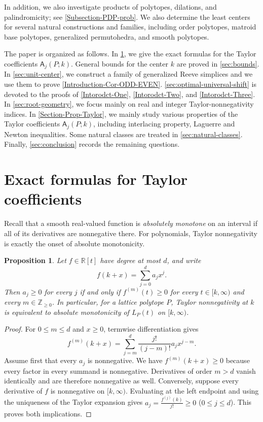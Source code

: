 \documentclass[reqno, 12pt]{article}
\numberwithin{equation}{section}
\newtheorem{proposition}[theorem]{Proposition}
\theoremstyle{definition}
\newcommand{\R}{\mathbb{R}}
\newcommand{\N}{\mathbb{Z}_{\geq 0}}
\newcommand{\A}{\mathsf{A}}
\begin{document}
In addition, we also investigate products of polytopes, dilations, and palindromicity; see \cref{Subsection-PDP-prob}.
We also determine the least centers for several natural constructions and families, including order polytopes, matroid base polytopes, generalized permutohedra, and smooth polytopes.


The paper is organized as follows. 
In \cref{sec:exact}, we give the exact formulas for the Taylor coefficients $\A_{j}(P;k)$.
General bounds for the center $k$ are proved in \cref{sec:bounds}. 
In \cref{sec:unit-center}, we construct a family of generalized Reeve simplices and we use them to prove \cref{Introduction-Cor-ODD-EVEN}.
\cref{sec:optimal-universal-shift} is devoted to the proofs of \cref{Intorodct-One}, \cref{Intorodct-Two}, and \cref{Intorodct-Three}.
In \cref{sec:root-geometry}, we focus mainly on real and integer Taylor-nonnegativity indices.
In \cref{Section-Prop-Taylor}, we mainly study various properties of the Taylor coefficients  $\A_j(P;k)$, including interlacing property, Laguerre and Newton inequalities.
Some natural classes are treated in \cref{sec:natural-classes}.  
Finally, \cref{sec:conclusion} records the remaining questions.



\section{Exact formulas for Taylor coefficients}
\label{sec:exact}

Recall that a smooth real-valued function is \emph{absolutely monotone} on an interval if all of its derivatives are nonnegative there. For polynomials, Taylor nonnegativity is exactly the onset of absolute monotonicity.

\begin{proposition}\label{prop:absolute-monotonicity}
Let $f\in\R[t]$ have degree at most $d$, and write
\[
 f(k+x)=\sum_{j=0}^{d}a_jx^j.
\]
Then $a_j\geq0$ for every $j$ if and only if $f^{(m)}(t)\geq0$ for every $t\in[k,\infty)$ and every $m\in\N$.
In particular, for a lattice polytope $P$, Taylor nonnegativity at $k$ is
equivalent to absolute monotonicity of $L_P(t)$ on $[k,\infty)$.
\end{proposition}
\begin{proof}
For $0\leq m\leq d$ and $x\geq0$, termwise differentiation gives
\[f^{(m)}(k+x)=\sum_{j=m}^{d}\frac{j!}{(j-m)!}a_jx^{j-m}.
\]
Assume first that every $a_j$ is nonnegative. We have $f^{(m)}(k+x)\geq0$ because every factor in every summand is nonnegative.  Derivatives of order $m>d$ vanish identically and are therefore nonnegative as well.
Conversely, suppose every derivative of $f$ is nonnegative on
$[k,\infty)$.  Evaluating at the left endpoint and using the uniqueness of
the Taylor expansion gives $a_j=\frac{f^{(j)}(k)}{j!}\geq0$ ($0\leq j\leq d$).
This proves both implications.
\end{proof}
\end{document}
